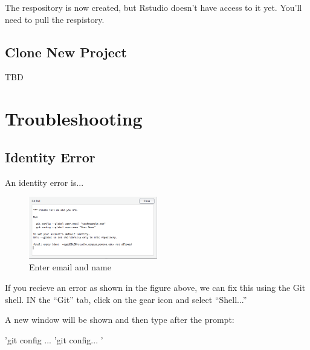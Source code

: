 \documentclass[12pt]{../SOP4_alpha}\usepackage[]{graphicx}\usepackage[]{color}
\begin{document}
\NP The respository is now created, but Rstudio doesn't have access to it yet. You'll need to pull the respistory.

\subsection{Clone New Project}

TBD




\section{Troubleshooting}

\subsection {Identity Error}

\NP An identity error is... 

\begin{figure}[H]
\centering
\includegraphics[width=0.5\textwidth]{graphics/IdentityError.png}
\caption{Enter email and name}
\end{figure}

\NP If you recieve an error as shown in the figure above, we can fix this using the Git shell. IN the ``Git'' tab, click on the gear icon and select ``Shell...'' 

\NP A new window will be shown and then type after the prompt:

'git config ...
'git config... '
\end{document}
